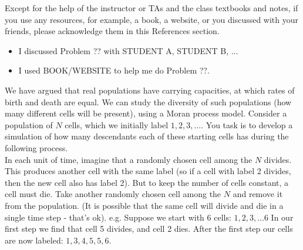 \documentclass[addpoints, 11pt]{exam}
\begin{document}
 Except for the help of the instructor or TAs and the class textbooks and notes, if you use any resources, for example, a book, a website, or you discussed with your friends, please acknowledge them in this References section. 
\begin{itemize}
\item I discussed Problem ?? with STUDENT A, STUDENT B, $\ldots$
\item I used BOOK/WEBSITE to help me do Problem ??.
\end{itemize}
\vspace{.05cm}
\begin{questions}
 We have argued that real populations have carrying capacities, at which rates of birth and death are equal. We can study the diversity of such populations (how many different cells will be present), using a Moran process model. Consider a population of $N$ cells, which we initially label $1,2,3, \ldots$. You task is to develop a simulation of how many descendants each of these starting cells has during the following process.\\

In each unit of time, imagine that a randomly chosen cell among the $N$ divides. This produces another cell with the same label (so if a cell with label 2 divides, then the new cell also has label 2). But to keep the number of cells constant, a cell must die. Take another randomly chosen cell among the $N$ and remove it from the population. (It is possible that the same cell will divide and die in a single time step - that's ok).
e.g. Suppose we start with 6 cells: $1,2,3, \ldots 6$ In our first step we find that cell 5 divides, and cell 2 dies. After the first step our cells are now labeled: $1,3,4,5,5,6$.
\end{questions}
\end{document}
